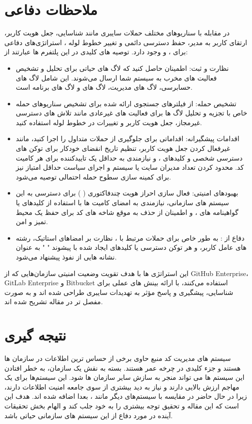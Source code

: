 \documentclass{CSICC}
\begin{document}
\section{ملاحظات دفاعی}
در مقابله با سناریوهای مختلف حملات سایبری مانند شناسایی، جعل هویت کاربر، ارتقای کاربر به مدیر، حفظ دسترسی دائمی و تغییر خطوط لوله
 ، استراتژی‌های دفاعی برای
  ، 
   و
    وجود دارد. توصیه‌ های کلیدی در این پلتفرم ‌ها عبارتند از:
\begin{itemize}
	\item
	نظارت و ثبت: اطمینان حاصل کنید که لاگ‌ های حیاتی برای تحلیل و تشخیص فعالیت‌ های مخرب به سیستم
	 شما ارسال می‌شوند. این شامل لاگ‌ های حسابرسی، لاگ‌ های مدیریت، لاگ‌ های
	  و لاگ ‌های برنامه است.
	\item 
	تشخیص حمله: از فیلترهای جستجوی ارائه شده برای تشخیص سناریوهای حمله خاص با تجزیه و تحلیل لاگ ‌ها برای فعالیت‌ های غیرعادی مانند تلاش‌ های دسترسی غیرمجاز، جعل هویت کاربر و تغییرات در خطوط لوله
	  استفاده کنید.
	\item 
	اقدامات پیشگیرانه: اقداماتی برای جلوگیری از حملات متداول را اجرا کنید، مانند غیرفعال کردن جعل هویت کاربر، تنظیم تاریخ انقضای خودکار برای توکن ‌های دسترسی شخصی و کلیدهای
	، و نیازمندی به حداقل یک تاییدکننده برای هر کامیت کد. محدود کردن تعداد مدیران سایت یا سیستم و اجرای سیاست حداقل امتیاز نیز برای کمینه سازی سطوح حمله احتمالی توصیه می‌شود.
	\item 
	بهبودهای امنیتی: فعال‌ سازی احراز هویت چندفاکتوری (
	) برای دسترسی به این سیستم‌ های سازمانی، نیازمندی به امضای کامیت ‌ها با استفاده از کلیدهای
	  یا گواهینامه‌ های 
	  ، و اطمینان از حذف به موقع شاخه ‌های کد برای حفظ یک محیط تمیز و امن.
	\item
	دفاع از
	: به طور خاص برای حملات مرتبط با 
	، نظارت بر امضاهای استاتیک، رشته ‌های عامل کاربر، و هر توکن دسترسی یا کلیدهای 
	 ایجاد شده با پیشوند "
	 " به عنوان نشانه ‌هایی از نفوذ پیشنهاد می‌شود.
\end{itemize}




این استراتژی ‌ها با هدف تقویت وضعیت امنیتی سازمان‌هایی که از GitHub Enterprise، GitLab Enterprise و Bitbucket استفاده می‌کنند، با ارائه بینش‌ های عملی برای شناسایی، پیشگیری و پاسخ مؤثر به تهدیدات سایبری طراحی شده‌ اند و به صورت مفصل تر در مقاله تشریح شده اند.

\section{نتیجه گیری}
سیستم های مدیریت کد منبع حاوی برخی از حساس ترین اطلاعات در سازمان ها هستند و جزء کلیدی در چرخه عمر
  هستند. بسته به نقش یک سازمان، به خطر افتادن این سیستم ها می تواند منجر به سازش سایر سازمان ها شود. این سیستم‌ها برای یک مهاجم ارزش بالایی دارند و نیاز به دید بیشتری از سوی جامعه امنیت اطلاعات دارند، زیرا در حال حاضر در مقایسه با سیستم‌های دیگر مانند 
  ، بعدا اضافه شده اند. هدف
   این است که این مقاله و تحقیق توجه بیشتری را به خود جلب کند و الهام بخش تحقیقات آینده در مورد دفاع از این سیستم های سازمانی حیاتی باشد.
\end{document}
